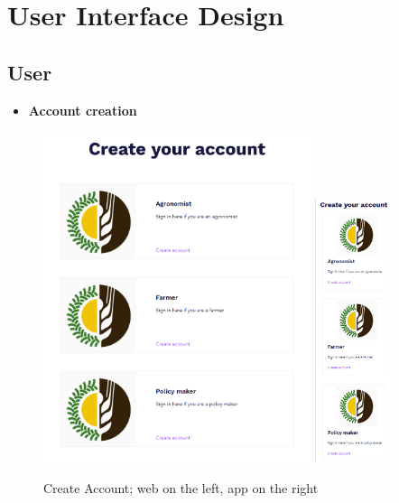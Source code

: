 \documentclass{article}
\begin{document}
\newpage

\newpage





\section{User Interface Design}

    \subsection{User}
    
    
    \begin{itemize}
        \item \textbf{Account creation}
    \end{itemize}
        \begin{figure} [h]
            \centering
            \includegraphics[width=0.7\textwidth]{images/UserInterfaces/CreateAccountWeb.png}
            \quad
            \includegraphics[width=0.2\textwidth]{images/UserInterfaces/CreateAccountApp.png}
            \quad
            \caption{\label{fig:accountCreation}Create Account; web on the left, app on the right}
        \end{figure}
    
\end{document}
